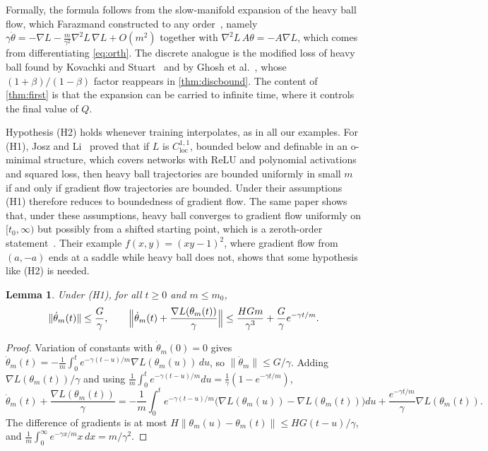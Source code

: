 \documentclass[11pt]{article}
\newtheorem{lemma}[theorem]{Lemma}
\theoremstyle{remark}
\theoremstyle{definition}
\begin{document}
Formally, the formula follows from the slow-manifold expansion of the heavy ball flow, which Farazmand constructed to any order~\cite{farazmand2020}, namely $\gamma\dot\theta=-\nabla L-\frac{m}{\gamma^2}\nabla^2L\,\nabla L+O(m^2)$ together with $\nabla^2L\,A\theta=-A\nabla L$, which comes from differentiating \eqref{eq:orth}. The discrete analogue is the modified loss of heavy ball found by Kovachki and Stuart~\cite{kovachki2021} and by Ghosh et al.~\cite{ghosh2023}, whose $(1+\beta)/(1-\beta)$ factor reappears in \cref{thm:discbound}. The content of \cref{thm:first} is that the expansion can be carried to infinite time, where it controls the final value of $Q$.

Hypothesis (H2) holds whenever training interpolates, as in all our examples. For (H1), Josz and Li~\cite{josz2024} proved that if $L$ is $C^{1,1}_{\mathrm{loc}}$, bounded below and definable in an o-minimal structure, which covers networks with ReLU and polynomial activations and squared loss, then heavy ball trajectories are bounded uniformly in small $m$ if and only if gradient flow trajectories are bounded. Under their assumptions (H1) therefore reduces to boundedness of gradient flow. The same paper shows that, under these assumptions, heavy ball converges to gradient flow uniformly on $[t_0,\infty)$ but possibly from a shifted starting point, which is a zeroth-order statement~\cite[Corollary 1]{josz2024}. Their example $f(x,y)=(xy-1)^2$, where gradient flow from $(a,-a)$ ends at a saddle while heavy ball does not, shows that some hypothesis like (H2) is needed.

\begin{lemma}\label{lem:layer}
Under (H1), for all $t\ge0$ and $m\le m_0$,
\[
\|\dot\theta_m(t)\|\le\frac G\gamma,\qquad
\Bigl\|\dot\theta_m(t)+\frac{\nabla L(\theta_m(t))}{\gamma}\Bigr\|\le\frac{HGm}{\gamma^3}+\frac G\gamma e^{-\gamma t/m}.
\]
\end{lemma}

\begin{proof}
Variation of constants with $\dot\theta_m(0)=0$ gives $\dot\theta_m(t)=-\frac1m\int_0^te^{-\gamma(t-u)/m}\nabla L(\theta_m(u))\,du$, so $\|\dot\theta_m\|\le G/\gamma$. Adding $\nabla L(\theta_m(t))/\gamma$ and using $\frac1m\int_0^te^{-\gamma(t-u)/m}du=\frac1\gamma(1-e^{-\gamma t/m})$,
\[
\dot\theta_m(t)+\frac{\nabla L(\theta_m(t))}{\gamma}=-\frac1m\int_0^te^{-\gamma(t-u)/m}\bigl(\nabla L(\theta_m(u))-\nabla L(\theta_m(t))\bigr)du+\frac{e^{-\gamma t/m}}{\gamma}\nabla L(\theta_m(t)).
\]
The difference of gradients is at most $H\|\theta_m(u)-\theta_m(t)\|\le HG(t-u)/\gamma$, and $\frac1m\int_0^\infty e^{-\gamma x/m}x\,dx=m/\gamma^2$.
\end{proof}
\end{document}
